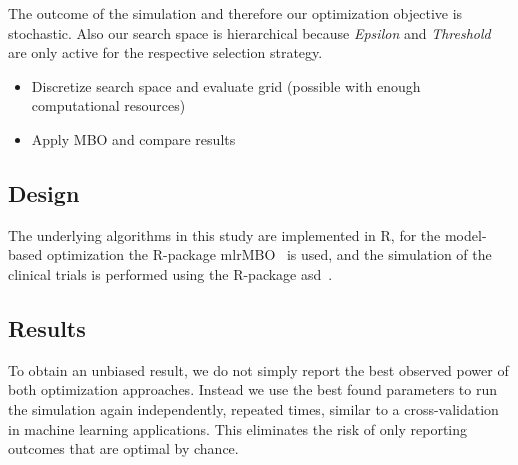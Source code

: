 \documentclass[bimj,fleqn]{w-art}
\theoremstyle{plain}
\theoremstyle{definition}
\begin{document}
The outcome of the simulation and therefore our optimization objective is stochastic.
Also our search space is hierarchical because \emph{Epsilon} and \emph{Threshold} are only active for the respective selection strategy.





\begin{itemize}
  \item Discretize search space and evaluate grid (possible with enough computational resources)
  \item Apply MBO and compare results
\end{itemize}



\subsection{Design}

The underlying algorithms in this study are implemented in R, for the model-based optimization the R-package mlrMBO~\citep{bischl_mlrmbo_2017} is used, and the simulation of the clinical trials is performed using the R-package asd~\citep{parsons_software_2011}.


\subsection{Results}

To obtain an unbiased result, we do not simply report the best observed power of both optimization approaches.
Instead we use the best found parameters to run the simulation again independently, repeated times, similar to a cross-validation in machine learning applications.
This eliminates the risk of only reporting outcomes that are optimal by chance.
\end{document}
